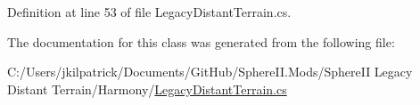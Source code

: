 Definition at line 53 of file Legacy\+Distant\+Terrain.\+cs.



The documentation for this class was generated from the following file\+:\begin{DoxyCompactItemize}
\item 
C\+:/\+Users/jkilpatrick/\+Documents/\+Git\+Hub/\+Sphere\+I\+I.\+Mods/\+Sphere\+I\+I Legacy Distant Terrain/\+Harmony/\mbox{\hyperlink{_legacy_distant_terrain_8cs}{Legacy\+Distant\+Terrain.\+cs}}\end{DoxyCompactItemize}
